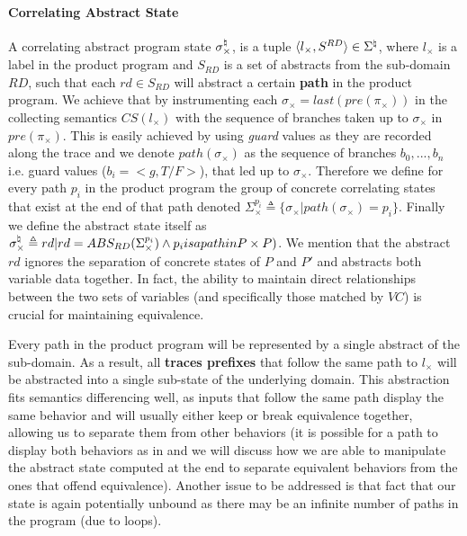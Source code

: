 \paragraph{Correlating Abstract State} 
A correlating abstract program state $\sigma_{\times}^\natural$, is a tuple $\langle l_{\times}, S^{RD} \rangle \in \Sigma^\natural$, where $l_{\times}$ is a label in the product program and $S_{RD}$ is a set of abstracts from the sub-domain $RD$, such that each $rd \in S_{RD}$ will abstract a certain \textbf{path} in the product program. We achieve that by instrumenting each $\sigma_{\times} = last(pre(\pi_{\times}))$ in the collecting semantics $CS(l_{\times})$ with the sequence of branches taken up to $\sigma_{\times}$ in $pre(\pi_{\times})$. This is easily achieved by using \emph{guard} values as they are recorded along the trace and we denote $path(\sigma_{\times})$ as the sequence of branches $b_0,...,b_n$ i.e. guard values ($b_i = <g,{T/F}>$), that led up to $\sigma_{\times}$. Therefore we define for every path $p_i$ in the product program the group of concrete correlating states that exist at the end of that path denoted $\Sigma_{\times}^{p_i} \triangleq \{ \sigma_{\times} | path(\sigma_{\times}) = p_i \}$. Finally we define the abstract state itself as $\sigma_{\times}^\natural \triangleq { rd | rd = ABS_{RD}(\Sigma_{\times}^{p_i}) \wedge p_i is a path in P \times P)}$. We mention that the abstract $rd$ ignores the separation of concrete states of $P$ and $P'$ and abstracts both variable data together. In fact, the ability to maintain direct relationships between the two sets of variables (and specifically those matched by $VC$) is crucial for maintaining equivalence.
 
Every path in the product program will be represented by a single abstract of the sub-domain. As a result, all \textbf{traces prefixes} that follow the same path to $l_{\times}$ will be abstracted into a single sub-state of the underlying domain. This abstraction fits semantics differencing well, as inputs that follow the same path display the same behavior and will usually either keep or break equivalence together, allowing us to separate them from other behaviors (it is possible for a path to display both behaviors as in  and we will discuss how we are able to manipulate the abstract state computed at the end to separate equivalent behaviors from the ones that offend equivalence). Another issue to be addressed is that fact that our state is again potentially unbound as there may be an infinite number of paths in the program (due to loops).

